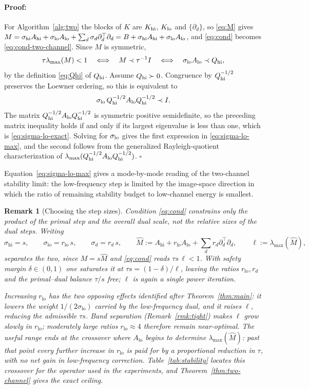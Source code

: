 \documentclass{article}
\newenvironment{proof}{\paragraph{Proof:}}{\hfill$\square$}
\newtheorem{remark}[theorem]{Remark}
\begin{document}
\begin{proof}
For Algorithm~\ref{alg:two} the blocks of $K$ are $K_{\rm hi}$, $K_{\rm lo}$ and $\{\partial_d\}$, so \eqref{eq:M} gives
$M=\sigma_{\rm hi}A_{\rm hi}+\sigma_{\rm lo}A_{\rm lo}+\sum_d\sigma_d\partial_d^\top\partial_d
=B+\sigma_{\rm hi}A_{\rm hi}+\sigma_{\rm lo}A_{\rm lo}$,
and \eqref{eq:cond} becomes \eqref{eq:cond-two-channel}. Since $M$ is symmetric,
\[
\tau\lambda_{\max}(M)<1
\quad\Longleftrightarrow\quad
M\prec\tau^{-1}I
\quad\Longleftrightarrow\quad
\sigma_{\rm lo}A_{\rm lo}
\prec
Q_{\rm hi},
\]
by the definition \eqref{eq:Qhi} of $Q_{\rm hi}$. Assume $Q_{\rm hi}\succ0$. Congruence by $Q_{\rm hi}^{-1/2}$ preserves the Loewner ordering, so this is equivalent to
\[
\sigma_{\rm lo}\,
Q_{\rm hi}^{-1/2}
A_{\rm lo}
Q_{\rm hi}^{-1/2}
\prec I .
\]
The matrix $Q_{\rm hi}^{-1/2}A_{\rm lo}Q_{\rm hi}^{-1/2}$ is symmetric positive semidefinite, so the preceding matrix inequality holds if and only if its largest eigenvalue is less than one, which is \eqref{eq:sigma-lo-exact}. Solving for $\sigma_{\rm lo}$ gives the first expression in \eqref{eq:sigma-lo-max}, and the second follows from the generalized Rayleigh-quotient characterization of $\lambda_{\max}(Q_{\rm hi}^{-1/2}A_{\rm lo}Q_{\rm hi}^{-1/2})$.
\end{proof}

Equation~\eqref{eq:sigma-lo-max} gives a mode-by-mode reading of the two-channel stability limit: the low-frequency step is limited by the image-space direction in which the ratio of remaining stability budget to low-channel energy is smallest.

\begin{remark}[Choosing the step sizes]
\label{rmk:choose}
Condition \eqref{eq:cond} constrains only the product of the primal step and the overall dual scale, not the relative sizes of the dual steps. Writing
\[
\sigma_{\mathrm{hi}}=s,
\qquad
\sigma_{\mathrm{lo}}=r_{\mathrm{lo}}\,s,
\qquad
\sigma_d=r_d\,s,
\qquad
\widehat M
:=
A_{\mathrm{hi}}+r_{\mathrm{lo}}A_{\mathrm{lo}}+\sum_dr_d\partial_d^\top\partial_d,
\qquad
\ell:=\lambda_{\max}(\widehat M),
\]
separates the two, since $M=s\widehat M$ and \eqref{eq:cond} reads $\tau s\,\ell<1$. With safety margin $\delta\in(0,1)$ one saturates it at $\tau s=(1-\delta)/\ell$, leaving the ratios $r_{\mathrm{lo}},r_d$ and the primal--dual balance $\tau/s$ free; $\ell$ is again a single power iteration.

Increasing $r_{\mathrm{lo}}$ has the two opposing effects identified after Theorem~\ref{thm:main}: it lowers the weight $1/(2\sigma_{\mathrm{lo}})$ carried by the low-frequency dual, and it raises $\ell$, reducing the admissible $\tau s$. Band separation (Remark~\ref{rmk:tight}) makes $\ell$ grow slowly in $r_{\mathrm{lo}}$; moderately large ratios $r_{\mathrm{lo}}\approx4$ therefore remain near-optimal. The useful range ends at the crossover where $A_{\mathrm{lo}}$ begins to determine $\lambda_{\max}(\widehat M)$: past that point every further increase in $r_{\mathrm{lo}}$ is paid for by a proportional reduction in $\tau$, with no net gain in low-frequency correction. Table~\ref{tab:stability} locates this crossover for the operator used in the experiments, and Theorem~\ref{thm:two-channel} gives the exact ceiling.
\end{remark}
\end{document}

